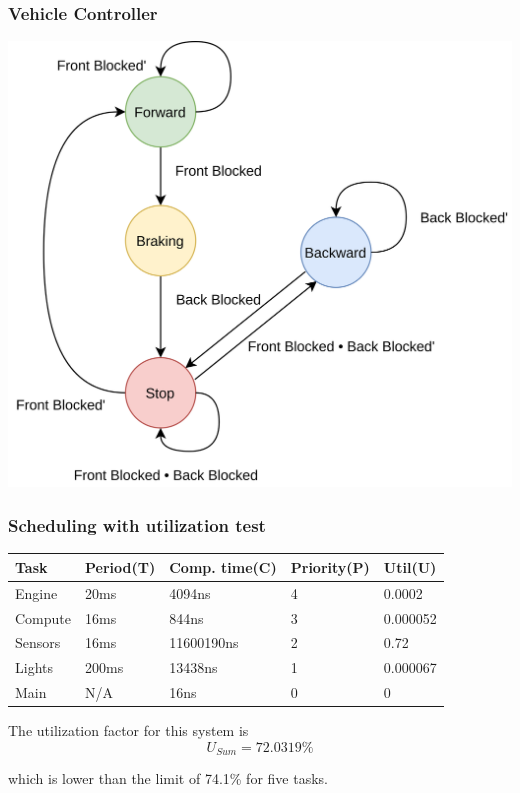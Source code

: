 \documentclass{beamer}
\begin{document}
    \begin{frame}
        \frametitle{Vehicle Controller}
        \centering
        \includegraphics[scale=0.06, keepaspectratio]{img/finite-state-machine.png}
    \end{frame}

    \begin{frame}
        \frametitle{Scheduling with utilization test}
        \begin{center}
            \begin{tabular}{||l l l l|l||}
                \hline
                Task & Period(T) & Comp. time(C) & Priority(P) & Util(U) \\ [0.5ex]
                \hline\hline
                Engine & 20ms & 4094ns & 4 & 0.0002 \\
                \hline
                Compute & 16ms & 844ns & 3 & 0.000052 \\
                \hline
                Sensors & 16ms & 11600190ns & 2 & 0.72 \\
                \hline
                Lights & 200ms & 13438ns & 1 & 0.000067 \\
                \hline
                Main & N/A & 16ns & 0 & 0 \\ [1ex]
                \hline
            \end{tabular}
        \end{center}

        The utilization factor for this system is
        \begin{equation*}
            U_{Sum} = 72.0319\%
        \end{equation*}

        which is lower than the limit of 74.1\% for five tasks.
    \end{frame}
\end{document}
